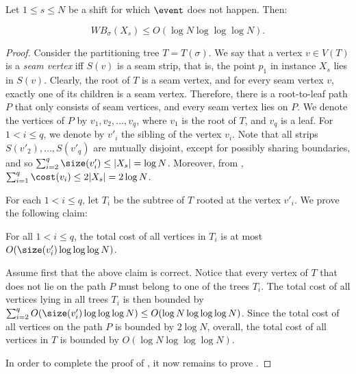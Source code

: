 \begin{lemma}\label{lem: no bad event low cost}
	Let $1\leq s\leq N$ be a shift for which $\event$ does not happen. Then:
	
	 $$WB_{\sigma}(X_s)\leq O(\log N\log\log\log N).$$
\end{lemma}

\begin{proof}
	Consider the partitioning tree $T=T(\sigma)$. 
We say that a vertex $v\in V(T)$ is a \emph{seam vertex} iff $S(v)$ is a seam strip, that is, the point $p_1$ in instance $X_s$ lies in $S(v)$.  
Clearly, the root of $T$ is a seam vertex, and for every seam vertex $v$, exactly one of its children is a seam vertex. 
Therefore, there is a root-to-leaf path $P$ that only consists of seam vertices, and every seam vertex lies on $P$. 
We denote the vertices of $P$ by $v_1,v_2,\ldots,v_q$, where $v_1$ is the root of $T$, and $v_q$ is a leaf. 
For $1<i\leq q$, we denote by $v'_i$ the sibling of the vertex $v_i$. 
Note that all strips $S(v'_2),\ldots,S(v'_q)$ are mutually disjoint, except for possibly sharing boundaries, and so $\sum_{i=2}^q\size(v'_i)\leq |X_s|= \log N$. 
Moreover, from , $\sum_{i=1}^q\cost(v_i)\leq 2|X_s|=2\log N$.
	
For each $1<i\leq q$, let $T_i$ be the subtree of $T$ rooted at the vertex $v'_i$. We prove the following claim:
	
	\begin{claim}\label{claim: bounding subtrees}
		For all $1<i\leq q$, the total cost of all vertices in $T_i$ is at most $O(\size(v'_i)\log\log\log N)$.
	\end{claim}
	
	Assume first that the above claim is correct. Notice that every vertex of $T$ that does not lie on the path $P$ must belong to one of the trees $T_i$. 
The total cost of all vertices lying in all trees $T_i$ is then bounded by $\sum_{i=2}^qO(\size(v'_i)\log\log\log N)\leq O(\log N\log\log\log N)$. 
Since the total cost of all vertices on the path $P$ is bounded by $2\log N$, overall, the total cost of all vertices in $T$ is bounded by $O(\log N\log\log\log N)$.


In order to complete the proof of , it now remains to prove .


\end{proof}
